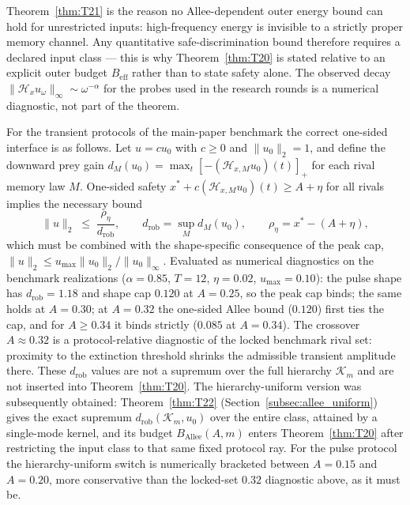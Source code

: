 Theorem~\ref{thm:T21} is the reason no Allee-dependent outer energy bound can hold for unrestricted inputs: high-frequency energy is invisible to a strictly proper memory channel. Any quantitative safe-discrimination bound therefore requires a declared input class --- this is why Theorem~\ref{thm:T20} is stated relative to an explicit outer budget $B_{\mathrm{eff}}$ rather than to state safety alone. The observed decay $\|\mathcal H_x u_\omega\|_\infty\sim \omega^{-\alpha}$ for the probes used in the research rounds is a numerical diagnostic, not part of the theorem.

For the transient protocols of the main-paper benchmark the correct one-sided interface is as follows. Let $u=c u_0$ with $c\ge0$ and $\|u_0\|_2=1$, and define the downward prey gain $d_M(u_0)=\max_t[-(\mathcal H_{x,M}u_0)(t)]_+$ for each rival memory law $M$. One-sided safety $x^*+c(\mathcal H_{x,M}u_0)(t)\ge A+\eta$ for all rivals implies the necessary bound
\[
\|u\|_2\;\le\;\frac{\rho_\eta}{d_{\mathrm{rob}}},
\qquad
d_{\mathrm{rob}}=\sup_M d_M(u_0),
\qquad
\rho_\eta=x^*-(A+\eta),
\]
which must be combined with the shape-specific consequence of the peak cap, $\|u\|_2\le u_{\max}\|u_0\|_2/\|u_0\|_\infty$. Evaluated as numerical diagnostics on the benchmark realizations ($\alpha=0.85$, $T=12$, $\eta=0.02$, $u_{\max}=0.10$): the pulse shape has $d_{\mathrm{rob}}=1.18$ and shape cap $0.120$ at $A=0.25$, so the peak cap binds; the same holds at $A=0.30$; at $A=0.32$ the one-sided Allee bound ($0.120$) first ties the cap, and for $A\ge0.34$ it binds strictly ($0.085$ at $A=0.34$). The crossover $A\approx0.32$ is a protocol-relative diagnostic of the locked benchmark rival set: proximity to the extinction threshold shrinks the admissible transient amplitude there. These $d_{\mathrm{rob}}$ values are not a supremum over the full hierarchy $\mathcal K_m$ and are not inserted into Theorem~\ref{thm:T20}. The hierarchy-uniform version was subsequently obtained: Theorem~\ref{thm:T22} (Section~\ref{subsec:allee_uniform}) gives the exact supremum $d_{\mathrm{rob}}(\mathcal K_m,u_0)$ over the entire class, attained by a single-mode kernel, and its budget $B_{\mathrm{Allee}}(A,m)$ enters Theorem~\ref{thm:T20} after restricting the input class to that same fixed protocol ray. For the pulse protocol the hierarchy-uniform switch is numerically bracketed between $A=0.15$ and $A=0.20$, more conservative than the locked-set $0.32$ diagnostic above, as it must be.